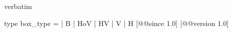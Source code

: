 \begin{camlexample}{verbatim}
\begin{caml}
\begin{camlinput}
type box_type = | B | HoV | HV | V | H [@@since 1.0] [@@version 1.0]
\end{camlinput}
\end{caml}
\end{camlexample}
